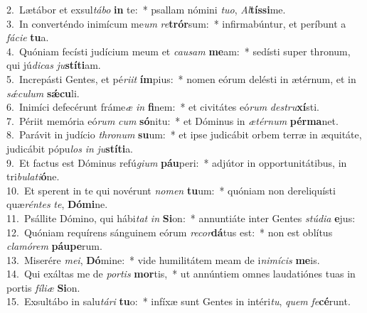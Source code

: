 {2.~}Lætábor et exsul\textit{tá}\textit{bo} \textbf{in} te:~* psallam nómini \textit{tu}\textit{o}, \textit{Al}\textbf{tís}\textbf{si}me.\\
{3.~}In converténdo inimícum me\textit{um} \textit{re}\textbf{trór}sum:~* infirmabúntur, et períbunt a \textit{fá}\textit{ci}\textit{e} \textbf{tu}a.\\
{4.~}Quóniam fecísti judícium meum et \textit{cau}\textit{sam} \textbf{me}am:~* sedísti super thronum, qui jú\textit{di}\textit{cas} \textit{ju}\textbf{stí}\textbf{ti}am.\\
{5.~}Increpásti Gentes, et pé\textit{ri}\textit{it} \textbf{ím}pius:~* nomen eórum delésti in ætérnum, et in \textit{sǽ}\textit{cu}\textit{lum} \textbf{sǽ}\textbf{cu}li.\\
{6.~}Inimíci defecérunt fráme\textit{æ} \textit{in} \textbf{fi}nem:~* et civitátes eó\textit{rum} \textit{de}\textit{stru}\textbf{xí}sti.\\
{7.~}Périit memória eó\textit{rum} \textit{cum} \textbf{só}nitu:~* et Dóminus in \textit{æ}\textit{tér}\textit{num} \textbf{pér}\textbf{ma}net.\\
{8.~}Parávit in judício \textit{thro}\textit{num} \textbf{su}um:~* et ipse judicábit orbem terræ in æquitáte, judicábit pópu\textit{los} \textit{in} \textit{ju}\textbf{stí}\textbf{ti}a.\\
{9.~}Et factus est Dóminus refú\textit{gi}\textit{um} \textbf{páu}peri:~* adjútor in opportunitátibus, in tri\textit{bu}\textit{la}\textit{ti}\textbf{ó}ne.\\
{10.~}Et sperent in te qui novérunt \textit{no}\textit{men} \textbf{tu}um:~* quóniam non dereliquísti quæ\textit{rén}\textit{tes} \textit{te}, \textbf{Dó}\textbf{mi}ne.\\
{11.~}Psállite Dómino, qui hábi\textit{tat} \textit{in} \textbf{Si}on:~* annuntiáte inter Gentes \textit{stú}\textit{di}\textit{a} \textbf{e}jus:\\
{12.~}Quóniam requírens sánguinem eórum \textit{re}\textit{cor}\textbf{dá}tus est:~* non est oblítus \textit{cla}\textit{mó}\textit{rem} \textbf{páu}\textbf{pe}rum.\\
{13.~}Miserére \textit{me}\textit{i}, \textbf{Dó}mine:~* vide humilitátem meam de i\textit{ni}\textit{mí}\textit{cis} \textbf{me}is.\\
{14.~}Qui exáltas me de \textit{por}\textit{tis} \textbf{mor}tis,~* ut annúntiem omnes laudatiónes tuas in portis \textit{fí}\textit{li}\textit{æ} \textbf{Si}on.\\
{15.~}Exsultábo in salu\textit{tá}\textit{ri} \textbf{tu}o:~* infíxæ sunt Gentes in intéri\textit{tu}, \textit{quem} \textit{fe}\textbf{cé}runt.\\
